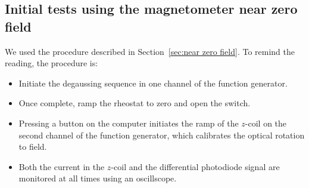 \subsection{Initial tests using the magnetometer near zero field}

   
  

We used the procedure described in Section~\ref{sec:near zero field}.  To
remind the reading, the procedure is:
\begin{itemize}
\item Initiate the degaussing sequence in one channel of the function
  generator.
\item Once complete, ramp the rheostat to zero and open the switch.
\item Pressing a button on the computer initiates the ramp of the
  $z$-coil on the second channel of the function generator, which
  calibrates the optical rotation to field.
\item Both the current in the $z$-coil and the differential photodiode
  signal are monitored at all times using an oscillscope.
\end{itemize}


